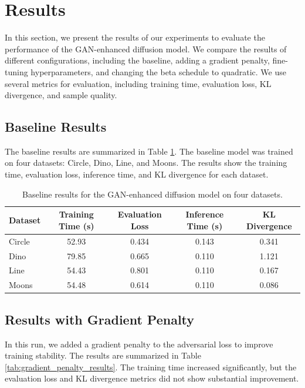 \documentclass{article} %
\begin{document}
\section{Results}
\label{sec:results}

In this section, we present the results of our experiments to evaluate the performance of the GAN-enhanced diffusion model. We compare the results of different configurations, including the baseline, adding a gradient penalty, fine-tuning hyperparameters, and changing the beta schedule to quadratic. We use several metrics for evaluation, including training time, evaluation loss, KL divergence, and sample quality.

\subsection{Baseline Results}
The baseline results are summarized in Table \ref{tab:baseline_results}. The baseline model was trained on four datasets: Circle, Dino, Line, and Moons. The results show the training time, evaluation loss, inference time, and KL divergence for each dataset.

\begin{table}[h]
    \centering
    \begin{tabular}{lcccc}
        \toprule
        Dataset & Training Time (s) & Evaluation Loss & Inference Time (s) & KL Divergence \\
        \midrule
        Circle & 52.93 & 0.434 & 0.143 & 0.341 \\
        Dino & 79.85 & 0.665 & 0.110 & 1.121 \\
        Line & 54.43 & 0.801 & 0.110 & 0.167 \\
        Moons & 54.48 & 0.614 & 0.110 & 0.086 \\
        \bottomrule
    \end{tabular}
    \caption{Baseline results for the GAN-enhanced diffusion model on four datasets.}
    \label{tab:baseline_results}
\end{table}

\subsection{Results with Gradient Penalty}
In this run, we added a gradient penalty to the adversarial loss to improve training stability. The results are summarized in Table \ref{tab:gradient_penalty_results}. The training time increased significantly, but the evaluation loss and KL divergence metrics did not show substantial improvement.
\end{document}
